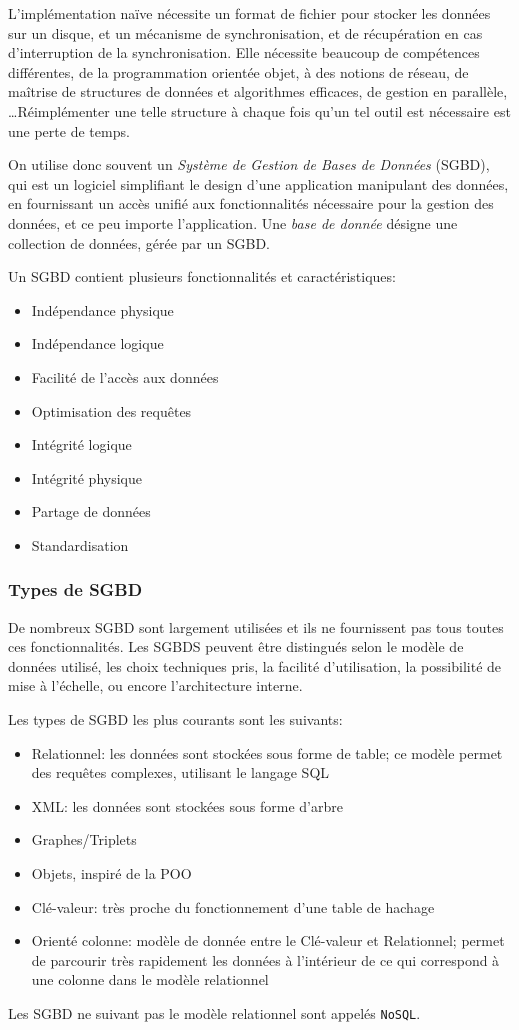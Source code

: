 \documentclass[french, toc]{../cs-classes/cs-classes}
\begin{document}
L'implémentation naïve nécessite un format de fichier pour stocker les données sur un disque, et un mécanisme de synchronisation, et de récupération en cas d'interruption de la synchronisation. Elle nécessite beaucoup de compétences différentes, de la programmation orientée objet, à des notions de réseau, de maîtrise de structures de données et algorithmes efficaces, de gestion en parallèle, \dots Réimplémenter une telle structure à chaque fois qu'un tel outil est nécessaire est une perte de temps. 

On utilise donc souvent un \emph{Système de Gestion de Bases de Données} (SGBD), qui est un logiciel simplifiant le design d'une application manipulant des données, en fournissant un accès unifié aux fonctionnalités nécessaire pour la gestion des données, et ce peu importe l'application. Une \emph{base de donnée} désigne une collection de données, gérée par un SGBD.

Un SGBD contient plusieurs fonctionnalités et caractéristiques:
\begin{itemize}
    \item Indépendance physique
    \item Indépendance logique
    \item Facilité de l'accès aux données
    \item Optimisation des requêtes
    \item Intégrité logique
    \item Intégrité physique
    \item Partage de données
    \item Standardisation
\end{itemize}

\subsubsection{Types de SGBD}
De nombreux SGBD sont largement utilisées et ils ne fournissent pas tous toutes ces fonctionnalités. Les SGBDS peuvent être distingués selon le modèle de données utilisé, les choix techniques pris, la facilité d'utilisation, la possibilité de mise à l'échelle, ou encore l'architecture interne.

Les types de SGBD les plus courants sont les suivants:
\begin{itemize}
    \item Relationnel: les données sont stockées sous forme de table; ce modèle permet des requêtes complexes, utilisant le langage SQL
    \item XML: les données sont stockées sous forme d'arbre
    \item Graphes/Triplets
    \item Objets, inspiré de la POO
    \item Clé-valeur: très proche du fonctionnement d'une table de hachage
    \item Orienté colonne: modèle de donnée entre le Clé-valeur et Relationnel; permet de parcourir très rapidement les données à l'intérieur de ce qui correspond à une colonne dans le modèle relationnel
\end{itemize}
Les SGBD ne suivant pas le modèle relationnel sont appelés \texttt{NoSQL}.
\end{document}
